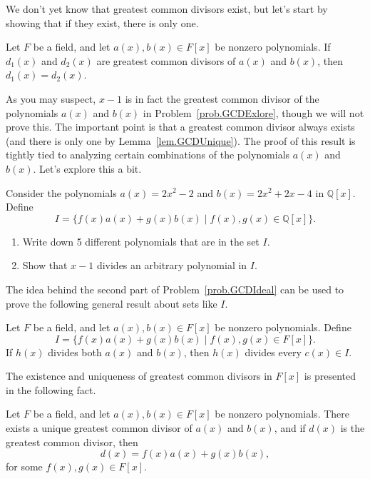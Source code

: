 We don't yet know that greatest common divisors exist, but let's start by showing that if they exist, there is only one.

\begin{lemma}\label{lem.GCDUnique}
Let $F$ be a field, and let $a(x), b(x)\in F[x]$ be nonzero polynomials. If $d_1(x)$ and $d_2(x)$ are  greatest common divisors of $a(x)$ and $b(x)$, then $d_1(x)=d_2(x)$.
\end{lemma}

As you may suspect, $x-1$ is in fact the greatest common divisor of the polynomials $a(x)$ and $b(x)$ in Problem~\ref{prob.GCDExlore}, though we will not prove this. 
The important point is that a greatest common divisor always exists (and there is only one by Lemma~\ref{lem.GCDUnique}). The proof of this result is tightly tied to analyzing certain combinations of the polynomials $a(x)$ and $b(x)$. Let's explore this a bit.

\begin{problem}\label{prob.GCDIdeal}
Consider the polynomials $a(x) = 2x^2-2$ and $b(x) = 2x^2+2x-4$ in $\mathbb{Q}[x]$.  Define \[I = \{f(x)a(x) + g(x)b(x)\mid f(x),g(x)\in \mathbb{Q}[x]\}.\]
\begin{enumerate}
\item Write down 5 different polynomials that are in the set $I$. 
\item Show that $x-1$ divides an arbitrary polynomial in $I$.
\end{enumerate}
\end{problem}

The idea behind the second part of Problem~\ref{prob.GCDIdeal} can be used to prove the following general result about sets like $I$.

\begin{theorem}\label{thm.HalfOfGCDProof}
Let $F$ be a field, and let $a(x), b(x)\in F[x]$ be nonzero polynomials. Define \[I = \{f(x)a(x) + g(x)b(x)\mid f(x),g(x)\in F[x]\}.\]
If $h(x)$ divides both $a(x)$ and $b(x)$, then $h(x)$ divides every $c(x)\in I$.
\end{theorem}

The existence and uniqueness of greatest common divisors in $F[x]$ is presented in the following fact.

\begin{fact}\label{fact.GCD}
Let $F$ be a field, and let $a(x), b(x)\in F[x]$ be nonzero polynomials. There exists a unique greatest common divisor of $a(x)$ and $b(x)$, and if $d(x)$ is the greatest common divisor, then \[d(x) = f(x)a(x) + g(x)b(x),\]
for some $f(x),g(x)\in F[x]$.
\end{fact}

